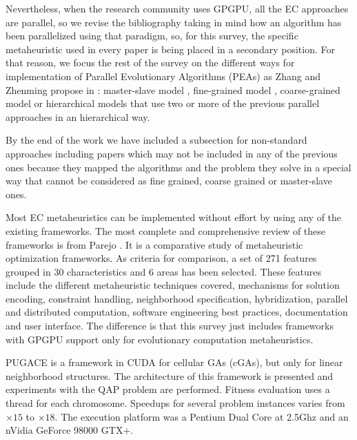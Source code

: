 \documentclass[review]{elsarticle}
\begin{document}
Nevertheless, when the research community uses GPGPU, all the EC approaches are parallel, so we revise the bibliography taking in mind how an algorithm has been parallelized using that paradigm, so, for this survey, the specific metaheuristic used in every paper is being placed in a secondary position.  For that reason, we focus the rest of the survey on the different ways for implementation of Parallel Evolutionary Algorithms (PEAs) as Zhang and Zhenming propose in \cite{ZhangImplementationMasterSlave}: master-slave model \cite{man-leung-wong-parallel-2005}, fine-grained model \cite{jian_ming_li_efficient_2007}, coarse-grained model \cite{Maitre:2009:CGP:1569901_1570089} \cite{pospichalParallelGeneticAlgorithOnCUDA2010} or hierarchical models  \cite{DBLP:conf/gecco/PospichalMOSJ11} that use two or more of the previous parallel approaches in an hierarchical way. 
 
By the end of the work we have included a subsection for non-standard approaches \cite{DBLP:conf/gecco/PospichalMOSJ11} including  papers which may not be included in any of the previous ones because they mapped the algorithms and the problem they solve in a special way that cannot be considered as fine grained, coarse grained or master-slave ones.


Most EC metaheuristics can be implemented without effort by using any of the existing frameworks. The most complete and comprehensive review of these frameworks is from Parejo \cite{springerlink:10.1007/s00500-011-0754-8}. It is a comparative study of metaheuristic optimization frameworks. As criteria for comparison, a set of 271 features grouped in 30 characteristics and 6 areas has been selected. These features include the different metaheuristic techniques covered, mechanisms for solution encoding, constraint handling, neighborhood specification, hybridization, parallel and distributed computation, software engineering best practices, documentation and user interface. The difference is that this survey just includes frameworks with GPGPU support only for evolutionary computation metaheuristics. 


PUGACE\cite{5586286} is a framework in CUDA for cellular GAs (cGAs), but only for linear neighborhood structures. The architecture of this framework is presented and experiments with the QAP problem are performed. Fitness evaluation uses a thread for each chromosome. Speedups for several problem instances varies from $\times15$ to $\times18$. The execution platform was a Pentium Dual Core at 2.5Ghz and an nVidia GeForce 98000 GTX+.
\end{document}
